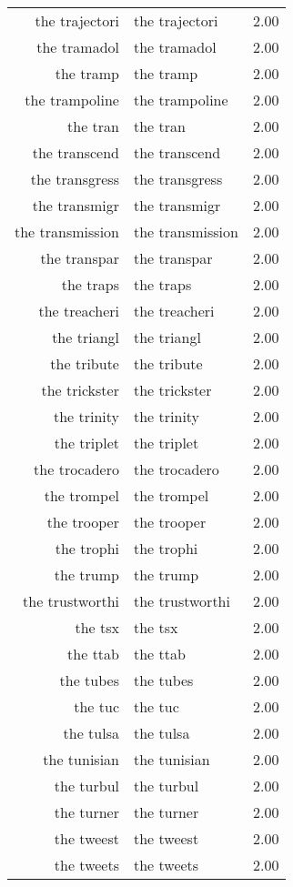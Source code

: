 \begin{table}[ht]
\begin{tabular}{rlr}
  the trajectori & the trajectori & 2.00 \\ 
  the tramadol & the tramadol & 2.00 \\ 
  the tramp & the tramp & 2.00 \\ 
  the trampoline & the trampoline & 2.00 \\ 
  the tran & the tran & 2.00 \\ 
  the transcend & the transcend & 2.00 \\ 
  the transgress & the transgress & 2.00 \\ 
  the transmigr & the transmigr & 2.00 \\ 
  the transmission & the transmission & 2.00 \\ 
  the transpar & the transpar & 2.00 \\ 
  the traps & the traps & 2.00 \\ 
  the treacheri & the treacheri & 2.00 \\ 
  the triangl & the triangl & 2.00 \\ 
  the tribute & the tribute & 2.00 \\ 
  the trickster & the trickster & 2.00 \\ 
  the trinity & the trinity & 2.00 \\ 
  the triplet & the triplet & 2.00 \\ 
  the trocadero & the trocadero & 2.00 \\ 
  the trompel & the trompel & 2.00 \\ 
  the trooper & the trooper & 2.00 \\ 
  the trophi & the trophi & 2.00 \\ 
  the trump & the trump & 2.00 \\ 
  the trustworthi & the trustworthi & 2.00 \\ 
  the tsx & the tsx & 2.00 \\ 
  the ttab & the ttab & 2.00 \\ 
  the tubes & the tubes & 2.00 \\ 
  the tuc & the tuc & 2.00 \\ 
  the tulsa & the tulsa & 2.00 \\ 
  the tunisian & the tunisian & 2.00 \\ 
  the turbul & the turbul & 2.00 \\ 
  the turner & the turner & 2.00 \\ 
  the tweest & the tweest & 2.00 \\ 
  the tweets & the tweets & 2.00 \\ 

\end{tabular}
\end{table}
